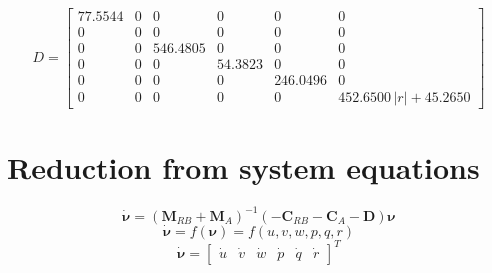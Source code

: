 \documentclass[12pt,a4]{article}
\begin{document}
\begin{equation*}
 	D = \left[\begin{array}{cccccc} 77.5544 & 0 & 0 & 0 & 0 & 0\\ 0 & 0 & 0 & 0 & 0 & 0\\ 0 & 0 & 546.4805 & 0 & 0 & 0\\ 0 & 0 & 0 & 54.3823 & 0 & 0\\ 0 & 0 & 0 & 0 & 246.0496 & 0\\ 0 & 0 & 0 & 0 & 0 & 452.6500\,\left|r\right|+45.2650 \end{array}\right]
\end{equation*}


\section{Reduction from system equations}
\begin{equation}
	\dot{\bm{\nu}} = (\bm{M}_{RB}+\bm{M}_{A})^{-1}(-\bm{C}_{RB}-\bm{C}_{A}-\bm{D})\bm{\nu}
\end{equation}
\begin{equation}
	\dot{\bm{\nu}} = f(\bm{\nu}) = f(u, v, w, p, q, r)
\end{equation}
\begin{equation}
	\dot{\bm{\nu}} = \begin{bmatrix}\dot{u}&\dot{v}&\dot{w}&\dot{p}&\dot{q}&\dot{r}\end{bmatrix}^T
\end{equation}
\end{document}
